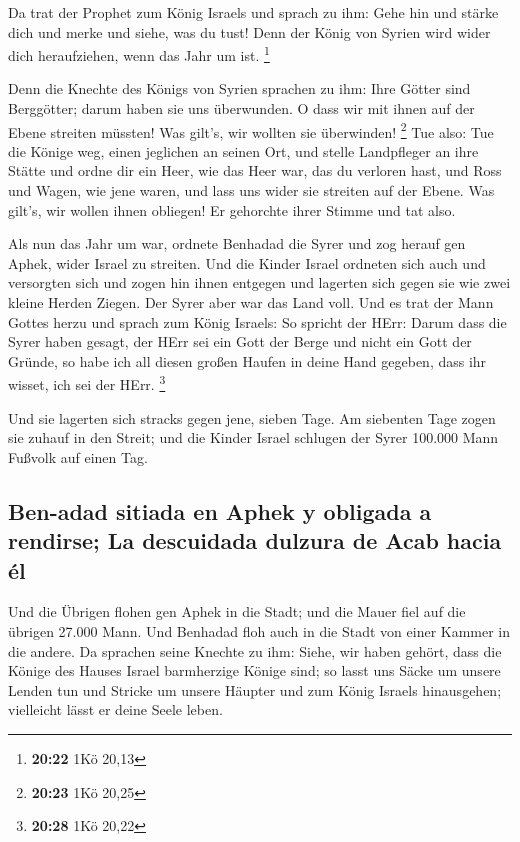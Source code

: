  Da trat der Prophet zum König Israels und sprach zu ihm:
Gehe hin und stärke dich und merke und siehe, was du tust! Denn der
König von Syrien wird wider dich heraufziehen, wenn das Jahr um ist.
\footnote{\textbf{20:22} 1Kö 20,13}

 Denn die Knechte des Königs von Syrien sprachen zu ihm:
Ihre Götter sind Berggötter; darum haben sie uns überwunden. O dass wir
mit ihnen auf der Ebene streiten müssten! Was gilt's, wir wollten sie
überwinden! \footnote{\textbf{20:23} 1Kö 20,25}  Tue
also: Tue die Könige weg, einen jeglichen an seinen Ort, und stelle
Landpfleger an ihre Stätte  und ordne dir ein Heer, wie
das Heer war, das du verloren hast, und Ross und Wagen, wie jene waren,
und lass uns wider sie streiten auf der Ebene. Was gilt's, wir wollen
ihnen obliegen! Er gehorchte ihrer Stimme und tat also.

 Als nun das Jahr um war, ordnete Benhadad die Syrer und
zog herauf gen Aphek, wider Israel zu streiten.  Und die
Kinder Israel ordneten sich auch und versorgten sich und zogen hin ihnen
entgegen und lagerten sich gegen sie wie zwei kleine Herden Ziegen. Der
Syrer aber war das Land voll.  Und es trat der Mann
Gottes herzu und sprach zum König Israels: So spricht der HErr: Darum
dass die Syrer haben gesagt, der HErr sei ein Gott der Berge und nicht
ein Gott der Gründe, so habe ich all diesen großen Haufen in deine Hand
gegeben, dass ihr wisset, ich sei der HErr. \footnote{\textbf{20:28} 1Kö
  20,22}

 Und sie lagerten sich stracks gegen jene, sieben Tage.
Am siebenten Tage zogen sie zuhauf in den Streit; und die Kinder Israel
schlugen der Syrer 100.000 Mann Fußvolk auf einen Tag.

\hypertarget{ben-adad-sitiada-en-aphek-y-obligada-a-rendirse-la-descuidada-dulzura-de-acab-hacia-uxe9l}{%
\subsection{Ben-adad sitiada en Aphek y obligada a rendirse; La
descuidada dulzura de Acab hacia
él}\label{ben-adad-sitiada-en-aphek-y-obligada-a-rendirse-la-descuidada-dulzura-de-acab-hacia-uxe9l}}

 Und die Übrigen flohen gen Aphek in die Stadt; und die
Mauer fiel auf die übrigen 27.000 Mann. Und Benhadad floh auch in die
Stadt von einer Kammer in die andere.  Da sprachen seine
Knechte zu ihm: Siehe, wir haben gehört, dass die Könige des Hauses
Israel barmherzige Könige sind; so lasst uns Säcke um unsere Lenden tun
und Stricke um unsere Häupter und zum König Israels hinausgehen;
vielleicht lässt er deine Seele leben.

